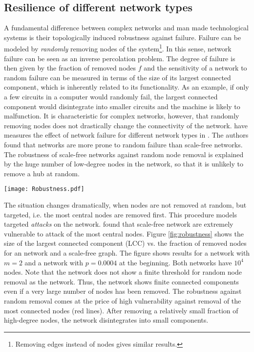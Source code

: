 \subsection{Resilience of different network types}\label{sec:resilience}
A fundamental difference between complex networks and man made technological systems is their topologically induced robustness against failure.
Failure can be modeled by \emph{randomly} removing nodes of the system\footnote{Removing edges instead of nodes gives similar results.}.
In this sense, network failure can be seen as an inverse percolation problem.
The degree of failure is then given by the fraction of removed nodes $f$ and the sensitivity of a network to random failure can be measured in terms of the size of its largest connected component, which is inherently related to its functionality.
As an example, if only a few circuits in a computer would randomly fail, the largest connected component would disintegrate into smaller circuits and the machine is likely to malfunction.
It is characteristic for complex networks, however, that randomly removing nodes does not drastically change the connectivity of the network.
\citeauthor{Albert:2000} have measures the effect of network failure for different network types in \citep{Albert:2000}.
The authors found that \ER networks are more prone to random failure than scale-free networks.
The robustness of scale-free networks against random node removal is explained by the huge number of low-degree nodes in the network, so that it is unlikely to remove a hub at random.
%
\begin{SCfigure}
\texttt{[image: Robustness.pdf]}
\caption{Robustness of a \BA  (BA) network and an \ER  (ER) graph to random failure (grey dashed line) and targeted attack (red).
Red lines represent the size of the largest connected component (LCC) under targeted removal of the most connected nodes.
The size of the LCC remains finite for the \BA network under random failure even for a large number of removed nodes.
}
\label{fig:robustness}
\end{SCfigure}
%

The situation changes dramatically, when nodes are not removed at random, but targeted, i.e. the most central nodes are removed first.
This procedure models targeted \emph{attacks} on the network.
\citeauthor{Albert:2000} found that scale-free network are extremely vulnerable to attack of the most central nodes.
Figure \ref{fig:robustness} shows the size of the largest connected component (LCC) vs. the fraction of removed nodes for an \ER network and a scale-free \BA graph.
The figure shows results for a \BA network with $m=2$ and a \ER network with $p=0.0004$ at the beginning.
Both networks have $10^4$ nodes.
Note that the \BA network does not show a finite threshold for random node removal as the \ER network.
Thus, the network shows finite connected components even if a very large number of nodes has been removed.
The robustness against random removal comes at the price of high vulnerability against removal of the most connected nodes (red lines).
After removing a relatively small fraction of high-degree nodes, the \BA network disintegrates into small components.

